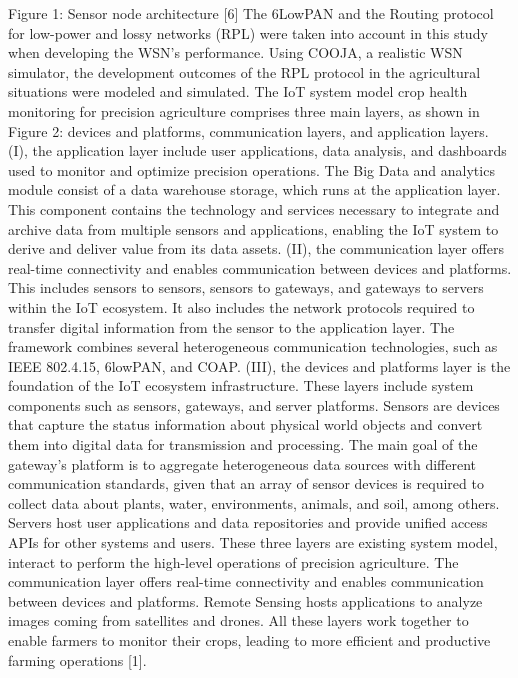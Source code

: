 \documentclass[12pt,a4paper]{report}
\begin{document}
\begin{List of Abbreviations}
Figure 1: Sensor node architecture [6]
The 6LowPAN and the Routing protocol for low-power and lossy networks (RPL) were taken into account in this study when developing the WSN's performance. Using COOJA, a realistic WSN simulator, the development outcomes of the RPL protocol in the agricultural situations were modeled and simulated. The IoT system model crop health monitoring for precision agriculture comprises three main layers, as shown in Figure 2: devices and platforms, communication layers, and application layers. 
(I), the application layer include user applications, data analysis, and dashboards used to monitor and optimize precision operations. The Big Data and analytics module consist of a data warehouse storage, which runs at the application layer. This component contains the technology and services necessary to integrate and archive data from multiple sensors and applications, enabling the IoT system to derive and deliver value from its data assets. 
(II), the communication layer offers real-time connectivity and enables communication between devices and platforms. This includes sensors to sensors, sensors to gateways, and gateways to servers within the IoT ecosystem. It also includes the network protocols required to transfer digital information from the sensor to the application layer. The framework combines several heterogeneous communication technologies, such as IEEE 802.4.15, 6lowPAN, and COAP. 
(III), the devices and platforms layer is the foundation of the IoT ecosystem infrastructure. These layers include system components such as sensors, gateways, and server platforms. Sensors are devices that capture the status information about physical world objects and convert them into digital data for transmission and processing. 
The main goal of the gateway’s platform is to aggregate heterogeneous data sources with different communication standards, given that an array of sensor devices is required to collect data about plants, water, environments, animals, and soil, among others. Servers host user applications and data repositories and provide unified access APIs for other systems and users. These three layers are existing system model, interact to perform the high-level operations of precision agriculture. The communication layer offers real-time connectivity and enables communication between devices and platforms. Remote Sensing hosts applications to analyze images coming from satellites and drones. All these layers work together to enable farmers to monitor their crops, leading to more efficient and productive farming operations [1].


\end{List of Abbreviations}
\end{document}
